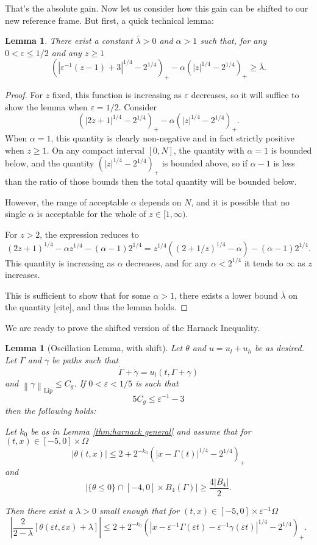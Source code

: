 \documentclass[11pt]{amsart}
\newtheorem{lemma}[theorem]{Lemma}
\theoremstyle{remark}
\theoremstyle{definition}
\newcommand{\eps}{\varepsilon}
\newcommand{\norm}[1]{\left\lVert#1\right\rVert}
\newcommand{\paren}[1]{\left( #1 \right)}
\newcommand{\bracket}[1]{\left[ #1 \right]}
\newcommand{\abs}[1]{\left\lvert #1 \right\rvert}
\newcommand{\Lip}{\text{Lip}}
\newcommand{\n}{^{-1}}
\newcommand{\ulow}{u_l}
\newcommand{\uhigh}{u_h}
\newcommand{\Cgamma}{C_g}
\begin{document}
That's the absolute gain.  Now let us consider how this gain can be shifted to our new reference frame.  But first, a quick technical lemma:

\begin{lemma} \label{thm:technical scaling of barrier}
There exist a constant $\bar{\lambda} > 0$ and $\alpha > 1$ such that, for any $0 < \eps \leq 1/2$ and any $z \geq 1$
\[ \paren{|\eps\n (z - 1) + 3|^{1/4} - 2^{1/4}}_+ - \alpha \paren{|z|^{1/4} - 2^{1/4}}_+ \geq \bar{\lambda}. \]
\end{lemma}

\begin{proof}
For $z$ fixed, this function is increasing as $\eps$ decreases, so it will suffice to show the lemma when $\eps = 1/2$.  Consider
\[ \paren{|2 z + 1|^{1/4} - 2^{1/4}}_+ - \alpha \paren{|z|^{1/4} - 2^{1/4}}_+. \]
When $\alpha = 1$, this quantity is clearly non-negative and in fact strictly positive when $z \geq 1$.  On any compact interval $[0,N]$, the quantity with $\alpha = 1$ is bounded below, and the quantity $\paren{|z|^{1/4} - 2^{1/4}}_+$ is bounded above, so if $\alpha-1$ is less than the ratio of those bounds then the total quantity will be bounded below.  

However, the range of acceptable $\alpha$ depends on $N$, and it is possible that no single $\alpha$ is acceptable for the whole of $z \in [1,\infty)$.  

For $z > 2$, the expression reduces to
\[ (2z+1)^{1/4} - \alpha z^{1/4} - (\alpha-1) 2^{1/4} = z^{1/4} \paren{(2 + 1/z)^{1/4} - \alpha} - (\alpha-1)2^{1/4}. \]
This quantity is increasing as $\alpha$ decreases, and for any $\alpha < 2^{1/4}$ it tends to $\infty$ as $z$ increases. 

This is sufficient to show that for some $\alpha > 1$, there exists a lower bound $\bar{\lambda}$ on the quantity [cite], and thus the lemma holds. 
\end{proof}

We are ready to prove the shifted version of the Harnack Inequality.  

\begin{lemma}[Oscillation Lemma, with shift] \label{thm:oscillation shifted}
Let $\theta$ and $u = \ulow + \uhigh$ be as desired.  Let $\Gamma$ and $\gamma$ be paths such that
\[ \dot{\Gamma} + \dot{\gamma} = \ulow(t,\Gamma+\gamma) \]
and $\norm{\gamma}_\Lip \leq \Cgamma$.  If $0 < \eps < 1/5$ is such that
\begin{equation} \label{Cgamma and eps for harnack} 5 \Cgamma \leq \eps\n - 3 \end{equation}
then the following holds:

Let $k_0$ be as in Lemma \ref{thm:harnack general} and assume that for $(t,x) \in [-5,0]\times \Omega$
\[ |\theta(t,x)| \leq 2 + 2^{-k_0} \paren{|x-\Gamma(t)|^{1/4}-2^{1/4}}_+ \]
and
\[ \abs{\{\theta \leq 0\} \cap [-4,0]\times B_4(\Gamma)} \geq \frac{4|B_4|}{2}. \]

Then there exist a $\lambda > 0$ small enough that for $(t,x) \in [-5,0]\times \eps\n \Omega$
\[ \abs{\frac{2}{2-\lambda} \bracket{\theta(\eps t, \eps x) + \lambda}} \leq 2 + 2^{-k_0} \paren{|x-\eps\n\Gamma(\eps t)-\eps\n\gamma(\eps t)|^{1/4}-2^{1/4}}_+. \]
\end{lemma}
\end{document}
